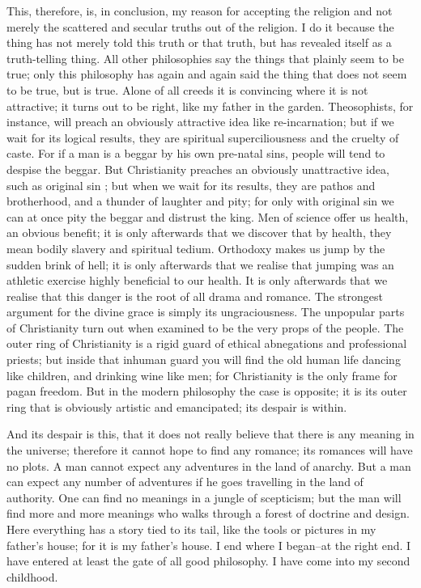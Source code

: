 \documentclass{book}
\begin{document}
This, therefore, is, in conclusion, my reason for accepting the religion and not merely the scattered and secular truths out of the religion. I do it because the thing has not merely told this truth or that truth, but has revealed itself as a truth-telling thing. All other philosophies say the things that plainly seem to be true; only this philosophy has again and again said the thing that does not seem to be true, but is true. Alone of all creeds it is convincing where it is not attractive; it turns out to be right, like my father in the garden. Theosophists, for instance, will preach an obviously attractive idea like re-incarnation; but if we wait for its logical results, they are spiritual superciliousness and the cruelty of caste. For if a man is a beggar by his own pre-natal sins, people will tend to despise the beggar. But Christianity preaches an obviously unattractive idea, such as original sin ; but when we wait for its results, they are pathos and brotherhood, and a thunder of laughter and pity; for only with original sin we can at once pity the beggar and distrust the king. Men of science offer us health, an obvious benefit; it is only afterwards that we discover that by health, they mean bodily slavery and spiritual tedium. Orthodoxy makes us jump by the sudden brink of hell; it is only afterwards that we realise that jumping was an athletic exercise highly beneficial to our health. It is only afterwards that we realise that this danger is the root of all drama and romance. The strongest argument for the divine grace is simply its ungraciousness. The unpopular parts of Christianity turn out when examined to be the very props of the people. The outer ring of Christianity is a rigid guard of ethical abnegations and professional priests; but inside that inhuman guard you will find the old human life dancing like children, and drinking wine like men; for Christianity is the only frame for pagan freedom. But in the modern philosophy the case is opposite; it is its outer ring that is obviously artistic and emancipated; its despair is within.

And its despair is this, that it does not really believe that there is any meaning in the universe; therefore it cannot hope to find any romance; its romances will have no plots. A man cannot expect any adventures in the land of anarchy. But a man can expect any number of adventures if he goes travelling in the land of authority. One can find no meanings in a jungle of scepticism; but the man will find more and more meanings who walks through a forest of doctrine and design. Here everything has a story tied to its tail, like the tools or pictures in my father’s house; for it is my father’s house. I end where I began–at the right end. I have entered at least the gate of all good philosophy. I have come into my second childhood.
\end{document}

